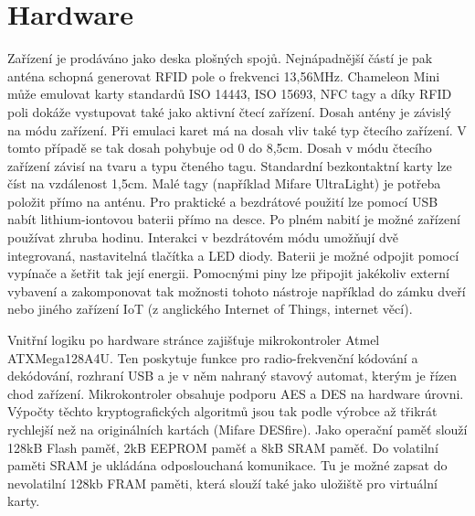 \section{Hardware}
Zařízení je prodáváno jako deska plošných spojů. Nejnápadnější částí je pak anténa schopná generovat RFID pole o frekvenci 13,56MHz. Chameleon Mini může emulovat karty standardů ISO 14443, ISO 15693, NFC tagy a díky RFID poli dokáže vystupovat také jako aktivní čtecí zařízení.\cite{ChameleonKickStarter} Dosah antény je závislý na módu zařízení. Při emulaci karet má na dosah vliv také typ čtecího zařízení. V tomto případě se tak dosah pohybuje od 0 do 8,5cm. Dosah v módu čtecího zařízení závisí na tvaru a typu čteného tagu. Standardní bezkontaktní karty lze číst na vzdálenost 1,5cm. Malé tagy (například Mifare UltraLight) je potřeba položit přímo na anténu.\cite{ChameleonEshop} Pro praktické a bezdrátové použití lze pomocí USB nabít {lithium-iontovou} baterii přímo na desce. Po plném nabití je možné zařízení používat zhruba hodinu. Interakci v bezdrátovém módu umožňují dvě integrovaná, nastavitelná tlačítka a LED diody. Baterii je možné odpojit pomocí vypínače a šetřit tak její energii. Pomocnými piny lze připojit jakékoliv externí vybavení a zakomponovat tak možnosti tohoto nástroje například do zámku dveří nebo jiného zařízení IoT (z anglického Internet of Things, internet věcí).\cite{ChameleonKickStarter}
\par
Vnitřní logiku po hardware stránce zajišťuje mikrokontroler Atmel ATXMega128A4U. Ten poskytuje funkce pro {radio-frekvenční} kódování a dekódování, rozhraní USB a je v něm nahraný stavový automat, kterým je řízen chod zařízení. Mikrokontroler obsahuje podporu AES a DES na hardware úrovni. Výpočty těchto kryptografických algoritmů jsou tak podle výrobce až třikrát rychlejší než na originálních kartách (Mifare DESfire). Jako operační paměť slouží 128kB Flash paměť, 2kB EEPROM paměť a 8kB SRAM paměť. Do volatilní paměti SRAM je ukládána odposlouchaná komunikace. Tu je možné zapsat do nevolatilní 128kb FRAM paměti, která slouží také jako uložiště pro virtuální karty.\cite{ChameleonKickStarter}

